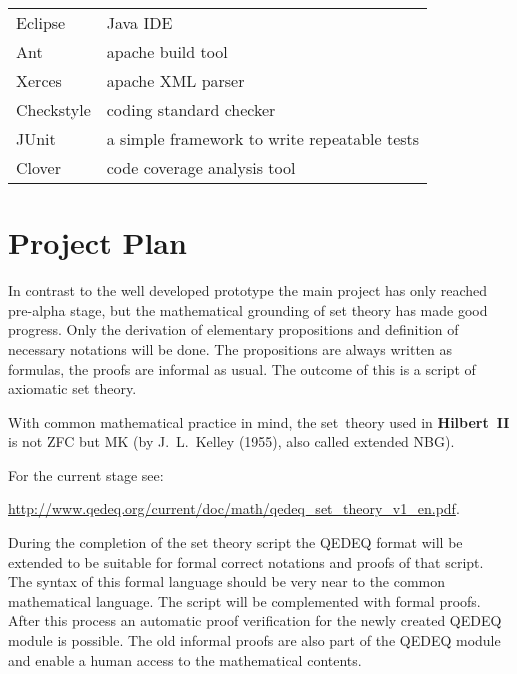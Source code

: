 \documentclass[a4paper,german,10pt,twoside]{book}
\theoremstyle{definition}
\theoremstyle{remark}
\begin{document}
\par
\begin{tabular}{ll}
  Eclipse    & Java IDE \\
  Ant        & apache build tool \\
  Xerces     & apache XML parser \\
  Checkstyle & coding standard checker \\
  JUnit      & a simple framework to write repeatable tests \\
  Clover     & code coverage analysis tool
\end{tabular}



\chapter{Project Plan\label{ch:project.plan}} \label{chapter6} \hypertarget{chapter6}{}

In contrast to the well developed prototype the main project has only reached pre-alpha stage, but the mathematical grounding of set theory has made good progress. Only the derivation of elementary propositions and definition of necessary notations will be done. The propositions are always written as formulas, the proofs are informal as usual. The outcome of this is a script of axiomatic set theory. 

\par
With common mathematical practice in mind, the set~theory used in \textbf{Hilbert~II} is not ZFC but MK (by J.~L.~Kelley (1955), also called extended NBG).

\par
For the current stage see: 

\par
\url{http://www.qedeq.org/current/doc/math/qedeq_set_theory_v1_en.pdf}.

\par
During the  completion of the set theory script the QEDEQ format will be extended to be suitable for  formal correct notations and proofs of that script. The syntax of this formal language should be very near to the common mathematical language. The script will be complemented with formal proofs. After this process an automatic proof verification for the newly created QEDEQ module is possible. The old informal proofs are also part of the QEDEQ module and enable a human access to the mathematical contents.
\end{document}
